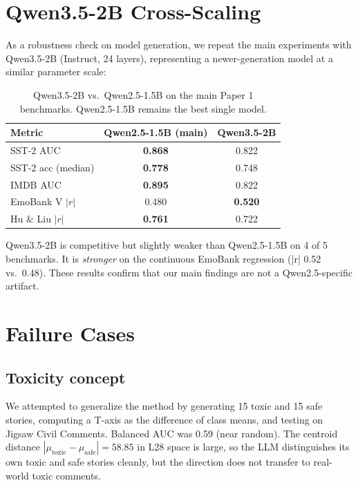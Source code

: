 \section{Qwen3.5-2B Cross-Scaling}
\label{sup:qwen35}

As a robustness check on model generation, we repeat the main
experiments with Qwen3.5-2B (Instruct, 24 layers), representing a
newer-generation model at a similar parameter scale:

\begin{table}[h]
\centering
\caption{Qwen3.5-2B vs.\ Qwen2.5-1.5B on the main Paper 1 benchmarks.
Qwen2.5-1.5B remains the best single model.}
\label{tab:sup_qwen35}
\begin{tabular}{lcc}
\toprule
Metric & Qwen2.5-1.5B (main) & Qwen3.5-2B \\
\midrule
SST-2 AUC           & \textbf{0.868} & 0.822 \\
SST-2 acc (median)  & \textbf{0.778} & 0.748 \\
IMDB AUC            & \textbf{0.895} & 0.822 \\
EmoBank V $|r|$     & 0.480          & \textbf{0.520} \\
Hu \& Liu $|r|$     & \textbf{0.761} & 0.722 \\
\bottomrule
\end{tabular}
\end{table}

Qwen3.5-2B is competitive but slightly weaker than Qwen2.5-1.5B on 4 of
5 benchmarks. It is \emph{stronger} on the continuous EmoBank regression
(|r| 0.52 vs.\ 0.48). These results confirm that our main findings are
not a Qwen2.5-specific artifact.

\section{Failure Cases}
\label{sup:failures}

\subsection{Toxicity concept}
We attempted to generalize the method by generating 15 toxic and 15 safe
stories, computing a T-axis as the difference of class means, and testing on
Jigsaw Civil Comments. Balanced AUC was 0.59 (near random). The centroid
distance $|\mu_{\mathrm{toxic}} - \mu_{\mathrm{safe}}| = 58.85$ in L28 space
is large, so the LLM distinguishes its own toxic and safe stories cleanly,
but the direction does not transfer to real-world toxic comments.

